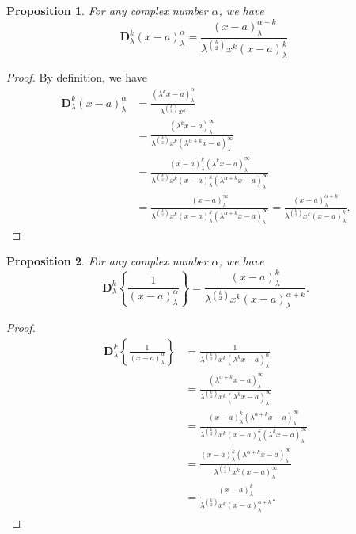\documentclass[12pt]{article}
\newcommand{\D}{\mathbf{D}}
\newtheorem{proposition}{Proposition}
\begin{document}
\begin{proposition}
For any complex number $\alpha$, we have
\begin{equation}
    \D_{\lambda}^{k}(x-a)_{\lambda}^\alpha=\frac{(x-a)_{\lambda}^{\alpha+k}}{\lambda^{\binom{k}{2}}x^k(x-a)_{\lambda}^k}.
\end{equation}
\end{proposition}
\begin{proof}
By definition, we have
    \begin{align*}
        \D_{\lambda}^{k}(x-a)_{\lambda}^\alpha&=\frac{(\lambda^kx-a)_{\lambda}^\alpha}{\lambda^{\binom{k}{2}}x^k}\\
        &=\frac{(\lambda^kx-a)_{\lambda}^{\infty}}{\lambda^{\binom{k}{2}}x^{k}(\lambda^{\alpha+k}x-a)_{\lambda}^{\infty}}\\
        &=\frac{(x-a)_{\lambda}^k(\lambda^kx-a)_{\lambda}^{\infty}}{\lambda^{\binom{k}{2}}x^k(x-a)_{\lambda}^k(\lambda^{\alpha+k}x-a)_{\lambda}^\infty}\\
        &=\frac{(x-a)_{\lambda}^\infty}{\lambda^{\binom{k}{2}}x^k(x-a)_{\lambda}^k(\lambda^{\alpha+k}x-a)_{\lambda}^\infty}=\frac{(x-a)_{\lambda}^{\alpha+k}}{\lambda^{\binom{k}{2}}x^k(x-a)_{\lambda}^k}.
    \end{align*}
\end{proof}

\begin{proposition}
For any complex number $\alpha$, we have
\begin{equation}
    \D_{\lambda}^{k}\left\{\frac{1}{(x-a)_{\lambda}^{\alpha}}\right\}=\frac{(x-a)_{\lambda}^k}{\lambda^{\binom{k}{2}}x^k(x-a)_{\lambda}^{\alpha+k}}.
\end{equation}
\end{proposition}
\begin{proof}
    \begin{align*}
        \D_{\lambda}^{k}\left\{\frac{1}{(x-a)_{\lambda}^{\alpha}}\right\}&=\frac{1}{\lambda^{\binom{k}{2}}x^k(\lambda^kx-a)_{\lambda}^\alpha}\\
        &=\frac{(\lambda^{\alpha+k}x-a)_{\lambda}^{\infty}}{\lambda^{\binom{k}{2}}x^k(\lambda^kx-a)_{\lambda}^{\infty}}\\
        &=\frac{(x-a)_{\lambda}^k(\lambda^{\alpha+k}x-a)_{\lambda}^{\infty}}{\lambda^{\binom{k}{2}}x^k(x-a)_{\lambda}^k(\lambda^kx-a)_{\lambda}^{\infty}}\\
        &=\frac{(x-a)_{\lambda}^k(\lambda^{\alpha+k}x-a)_{\lambda}^{\infty}}{\lambda^{\binom{k}{2}}x^k(x-a)_{\lambda}^{\infty}}\\
        &=\frac{(x-a)_{\lambda}^k}{\lambda^{\binom{k}{2}}x^k(x-a)_{\lambda}^{\alpha+k}}.
    \end{align*}
\end{proof}
\end{document}
